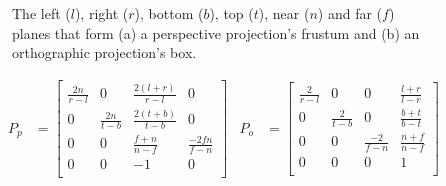 \begin{figure}[tb]
\centering
{}
\qquad
{}
\caption[Perspective projection's frustum and orthographic projection's box]{The left ($l$), right ($r$), bottom ($b$), top ($t$), near ($n$) and far ($f$) planes that form (a) a perspective projection's frustum and (b) an orthographic projection's box.}
\label{fig:frustum}
\end{figure}

\begin{align*}
P_p &= \begin{bmatrix} 
\frac{2n}{r-l} & 0 & \frac{2(l+r)}{r-l} & 0 \\
0 & \frac{2n}{t-b} & \frac{2(t+b)}{t-b} & 0 \\
0 & 0 & \frac{f+n}{n-f} & \frac{-2fn}{f-n} \\
0 & 0 & -1 & 0 \\
\end{bmatrix} &
P_o &= \begin{bmatrix} 
\frac{2}{r-l} & 0 & 0 & \frac{l+r}{l-r} \\
0 & \frac{2}{t-b} & 0 & \frac{b+t}{b-t} \\
0 & 0 & \frac{-2}{f-n} & \frac{n+f}{n-f} \\
0 & 0 & 0 & 1 \\
\end{bmatrix}
\end{align*}

